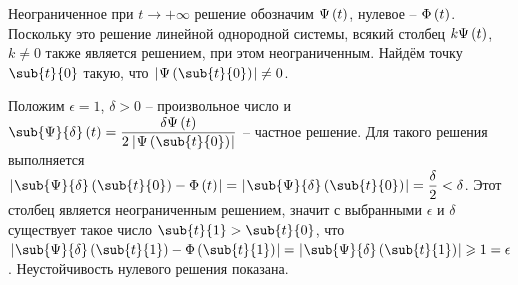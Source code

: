 \documentclass[a5paper,10pt]{article}
\begin{document}
Неограниченное при $t \to +\infty$ решение обозначим $\Psi\left(\hspace{0.01em}t\hspace{0.01em}\right)$,
нулевое -- $\Phi\left(\hspace{0.01em}t\hspace{0.01em}\right)$. 
Поскольку это решение линейной однородной системы, всякий столбец
$k \Psi\left(\hspace{0.01em}t\hspace{0.01em}\right)$, $k \ne 0$ также является решением, при этом неограниченным. 
Найдём точку $\sub{t}{0}$ такую, что $\vbr{\Psi\br{\sub{t}{0}}} \ne 0$.

Положим $\epsilon = 1$, $\delta > 0$ -- произвольное число и 
$\sub{\Psi}{\delta}\br{t} = \dfrac {\delta \Psi\br{t}} {2\vbr{\Psi\br{\sub{t}{0}}}}$
-- частное решение.
Для такого решения выполняется
$\vbr{\sub{\Psi}{\delta}\br{\sub{t}{0}} - \Phi\br{t}}
    = \vbr{\sub{\Psi}{\delta}\br{\sub{t}{0}}} = \dfrac {\delta} {2} < \delta$.
Этот столбец является неограниченным решением, значит с выбранными 
$\epsilon$ и $\delta$ существует такое число $\sub{t}{1} > \sub{t}{0}$,
что 
$\vbr{\sub{\Psi}{\delta}\br{\sub{t}{1}} - \Phi\br{\sub{t}{1}}}
    = \vbr{\sub{\Psi}{\delta}\br{\sub{t}{1}}} \ge 1 = \epsilon$.
Неустойчивость нулевого решения показана.
\end{document}
